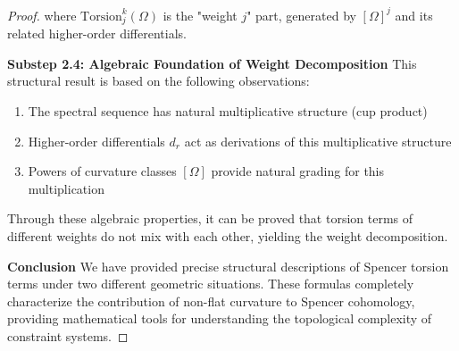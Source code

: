 \documentclass[10pt,a4paper]{amsart}
\begin{document}
\begin{proof}
where $\text{Torsion}^k_j(\Omega)$ is the "weight $j$" part, generated by $[\Omega]^j$ and its related higher-order differentials.

\textbf{Substep 2.4: Algebraic Foundation of Weight Decomposition}
This structural result is based on the following observations:
\begin{enumerate}
\item The spectral sequence has natural multiplicative structure (cup product)
\item Higher-order differentials $d_r$ act as derivations of this multiplicative structure
\item Powers of curvature classes $[\Omega]$ provide natural grading for this multiplication
\end{enumerate}

Through these algebraic properties, it can be proved that torsion terms of different weights do not mix with each other, yielding the weight decomposition.

\textbf{Conclusion}
We have provided precise structural descriptions of Spencer torsion terms under two different geometric situations. These formulas completely characterize the contribution of non-flat curvature to Spencer cohomology, providing mathematical tools for understanding the topological complexity of constraint systems.
\end{proof}
\end{document}
